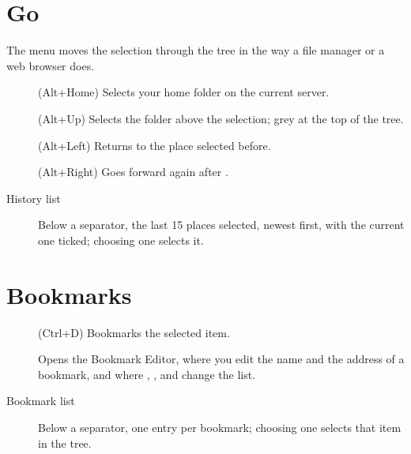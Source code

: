 \section{Go}
The  menu moves the selection through the tree in the way a file manager or a web browser does.
\begin{description}
	\item[] (\textsf{Alt+Home}) Selects your home folder on the current server.
	\item[] (\textsf{Alt+Up}) Selects the folder above the selection; grey at the top of the tree.
	\item[] (\textsf{Alt+Left}) Returns to the place selected before.
	\item[] (\textsf{Alt+Right}) Goes forward again after .
	\item[History list] Below a separator, the last 15 places selected, newest first, with the current one ticked; choosing one selects it.
\end{description}

\section{Bookmarks}
\begin{description}
	\item[] (\textsf{Ctrl+D}) Bookmarks the selected item.
	\item[] Opens the Bookmark Editor, where you edit the name and the address of a bookmark, and where , ,  and  change the list.
	\item[Bookmark list] Below a separator, one entry per bookmark; choosing one selects that item in the tree.
\end{description}

